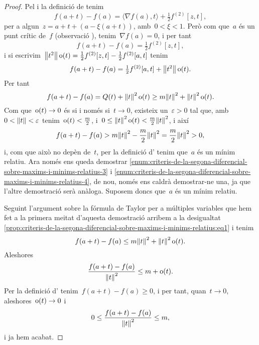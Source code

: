 \documentclass[../calcul-en-diverses-variables.tex]{subfiles}
\begin{document}
\begin{proof}
        Pel  i la definició de  tenim
        \[
            f(a+t)-f(a)=\langle\nabla f(a),t\rangle+\tfrac{1}{2}f^{(2)}[z,t],
        \]
        per a algun~\(z=a+t+(a-\xi(a+t))\), amb~\(0<\xi<1\).
        Però com que~\(a\) és un punt crític de~\(f\) (observació ), tenim~\(\nabla f(a)=0\), i per tant
        \[
            f(a+t)-f(a)=\tfrac{1}{2}f^{(2)}[z,t],
        \]
        i si escrivim~\(\norm{t^{2}}\omicron(t)=\frac{1}{2}f^{(2)}[z,t]-\frac{1}{2}f^{(2)}[a,t]\) tenim
        \[
            f(a+t)-f(a)=\tfrac{1}{2}f^{(2)}[a,t]+\norm{t^{2}}\omicron(t).
        \]
        Per tant
        \begin{equation}\label{prop:criteris-de-la-segona-diferencial-sobre-maxims-i-minims-relatius:eq1}
        f(a+t)-f(a)=Q(t)+\norm{t}^{2}\omicron(t)\geq m\norm{t}^{2}+\norm{t}^{2}\omicron(t).
        \end{equation}
        Com que~\(\operatorname{o}(t)\to0\) és si i només si~\(t\to0\), existeix un~\(\varepsilon>0\) tal que, amb~\(0<\norm{t}<\varepsilon\) tenim~\(\operatorname{o}(t)<\frac{m}{2}\), i~\(0\leq\norm{t}^{2}\omicron(t)<\frac{m}{2}\norm{t}^{2}\), i així
        \[
            f(a+t)-f(a)>m\norm{t}^{2}-\frac{m}{2}\norm{t}^{2}=\frac{m}{2}\norm{t}^{2}>0,
        \]
        i, com que això no depèn de~\(t\), per la definició d' tenim que~\(a\) és un mínim relatiu.
        Ara només ens queda demostrar \eqref{enum:criteris-de-la-segona-diferencial-sobre-maxims-i-minims-relatius-3} i \eqref{enum:criteris-de-la-segona-diferencial-sobre-maxims-i-minims-relatius-4}, de nou, només ens caldrà demostrar-ne una, ja que l'altre demostració serà anàloga.
        Suposem doncs que~\(a\) és un mínim relatiu.

        Seguint l'argument sobre la fórmula de Taylor per a múltiples variables que hem fet a la primera meitat d'aquesta demostració arribem a la desigualtat \eqref{prop:criteris-de-la-segona-diferencial-sobre-maxims-i-minims-relatius:eq1} i tenim
        \[
            f(a+t)-f(a)\leq m\norm{t}^{2}+\norm{t}^{2}\omicron(t).
        \]
        Aleshores
        \[
            \frac{f(a+t)-f(a)}{\norm{t}^{2}}\leq m+\omicron(t).
        \]
        Per la definició d' tenim~\(f(a+t)-f(a)\geq0\), i per tant, quan~\(t\to0\), aleshores~\(\operatorname{o}(t)\to0\) i
        \[
            0\leq\frac{f(a+t)-f(a)}{\norm{t}^{2}}\leq m,
        \]
        i ja hem acabat.
    \end{proof}
\end{document}
